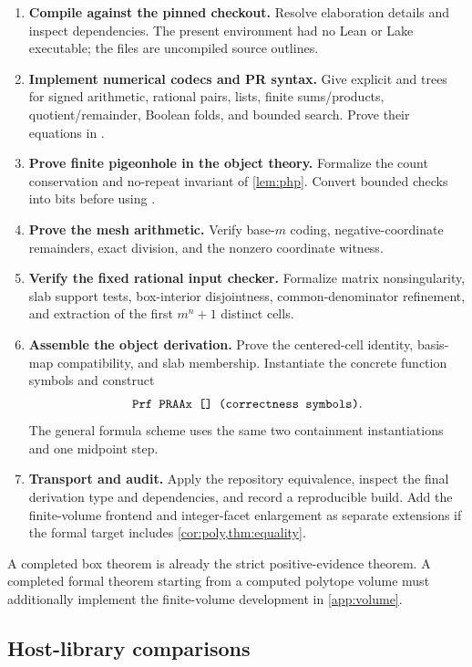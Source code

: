 \begin{enumerate}
\item \textbf{Compile against the pinned checkout.}
Resolve elaboration details and inspect dependencies.
The present environment had no Lean or Lake executable;
the files are uncompiled source outlines.
\item \textbf{Implement numerical codecs and PR syntax.}
Give explicit  and  trees
for signed arithmetic, rational pairs, lists,
finite sums/products, quotient/remainder,
Boolean folds, and bounded search. Prove their
equations in .
\item \textbf{Prove finite pigeonhole in the object theory.}
Formalize the count conservation and no-repeat
invariant of \cref{lem:php}. Convert bounded
checks into bits before using .
\item \textbf{Prove the mesh arithmetic.}
Verify base-\(m\) coding, negative-coordinate
remainders, exact division, and the nonzero
coordinate witness.
\item \textbf{Verify the fixed rational input checker.}
Formalize matrix nonsingularity, slab support tests,
box-interior disjointness, common-denominator
refinement, and extraction of the first \(m^n+1\)
distinct cells.
\item \textbf{Assemble the object derivation.}
Prove the centered-cell identity, basis-map
compatibility, and slab membership. Instantiate
the concrete function symbols and construct
\[
                   \code{Prf PRAAx [] (correctness symbols)}.
\]
The general formula scheme uses the same two
containment instantiations and one midpoint step.
\item \textbf{Transport and audit.}
Apply the repository equivalence, inspect the final
derivation type and dependencies, and record a
reproducible build. Add the finite-volume frontend
and integer-facet enlargement as separate extensions
if the formal target includes
\cref{cor:poly,thm:equality}.
\end{enumerate}

A completed box theorem is already the strict
positive-evidence theorem. A completed formal
theorem starting from a computed polytope volume
must additionally implement the finite-volume
development in \cref{app:volume}.

\subsection{Host-library comparisons}

